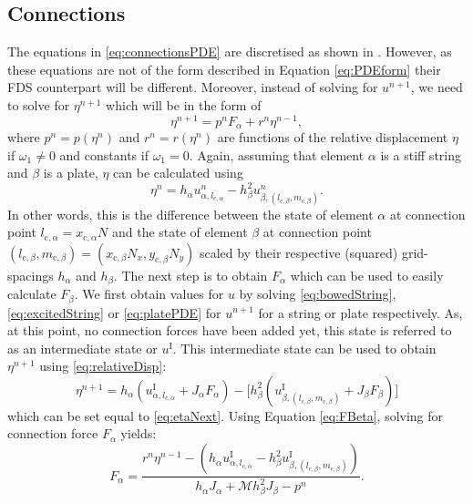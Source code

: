 \documentclass{article}
\begin{document}
\subsection{Connections}
The equations in \eqref{eq:connectionsPDE} are discretised as shown in \cite{Bilbao2009:ModularPercussion}. However, as these equations are not of the form described in Equation \eqref{eq:PDEform} their FDS counterpart will be different. Moreover, instead of solving for $u^{n+1}$, we need to solve for $\eta^{n+1}$ which will be in the form of
\begin{equation}\label{eq:etaNext}
    \eta^{n+1} = p^nF_\alpha + r^n\eta^{n-1},
\end{equation}
where $p^n = p(\eta^n)$ and $r^n = r(\eta^n)$ are functions of the relative displacement $\eta$ if $\omega_1 \neq 0$ and constants if $\omega_1 = 0$. Again, assuming that element $\alpha$ is a stiff string and $\beta$ is a plate, $\eta$ can be calculated using
\begin{equation}\label{eq:relativeDisp}
    \eta^n = h_\alpha u_{\alpha, l_{\text{c},\alpha}}^n - h_\beta^2 u_{\beta,(l_{\text{c},\beta}, m_{\text{c},\beta})}^n.
\end{equation}
In other words, this is the difference between the state of element $\alpha$ at connection point $l_{\text{c},\alpha} = x_{\text{c},\alpha}N$ and the state of element $\beta$ at connection point $(l_{\text{c},\beta}, m_{\text{c},\beta}) = (x_{\text{c},\beta}N_x,  y_{\text{c},\beta}N_y)$ scaled by their respective (squared) grid-spacings $h_\alpha$ and $h_\beta$. %
The next step is to obtain $F_\alpha$ which can be used to easily calculate $F_\beta$. We first obtain values for $u$ by solving \eqref{eq:bowedString}, \eqref{eq:excitedString} or \eqref{eq:platePDE} for $u^{n+1}$ for a string or plate respectively. As, at this point, no connection forces have been added yet, this state is referred to as an intermediate state or $u^\text{I}$. This intermediate state can be used to obtain $\eta^{n+1}$ using \eqref{eq:relativeDisp}:
\begin{equation}
    \eta^{n+1} = h_\alpha( u_{\alpha,l_{\text{c},\alpha}}^\text{I} + J_\alpha F_\alpha) - \Big[h^2_\beta( u_{\beta,(l_{\text{c},\beta}, m_{\text{c},\beta})}^\text{I} 
    + J_\beta F_\beta)\Big]
\end{equation}
which can be set equal to \eqref{eq:etaNext}. Using Equation \eqref{eq:FBeta}, solving for connection force $F_\alpha$ yields:
\begin{equation}
    F_\alpha = \frac{r^n\eta^{n-1}-(h_\alpha u_{\alpha, l_{\text{c},\alpha}}^\text{I} - h^2_\beta u_{\beta,(l_{\text{c},\beta},m_{\text{c},\beta})}^\text{I})}{h_\alpha J_\alpha + \mathcal{M}h^2_\beta J_\beta-p^n}.
\end{equation}
\end{document}
